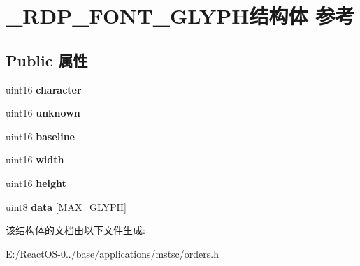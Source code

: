 \hypertarget{struct___r_d_p___f_o_n_t___g_l_y_p_h}{}\section{\+\_\+\+R\+D\+P\+\_\+\+F\+O\+N\+T\+\_\+\+G\+L\+Y\+P\+H结构体 参考}
\label{struct___r_d_p___f_o_n_t___g_l_y_p_h}
\subsection*{Public 属性}
\begin{DoxyCompactItemize}
\item 
\mbox{\label{struct___r_d_p___f_o_n_t___g_l_y_p_h_ae4639910e2f6b82de87cd71791132232}} 
uint16 {\bfseries character}
\item 
\mbox{\label{struct___r_d_p___f_o_n_t___g_l_y_p_h_a5715a1e66a080bb0d429796d40be05cf}} 
uint16 {\bfseries unknown}
\item 
\mbox{\label{struct___r_d_p___f_o_n_t___g_l_y_p_h_a91fbf7d173b2189c58fc49729c3cee1b}} 
uint16 {\bfseries baseline}
\item 
\mbox{\label{struct___r_d_p___f_o_n_t___g_l_y_p_h_a0409fa89acf53b53bfaee92eb9338c5c}} 
uint16 {\bfseries width}
\item 
\mbox{\label{struct___r_d_p___f_o_n_t___g_l_y_p_h_a1af27fcff7b4b81e06b05016b24d035b}} 
uint16 {\bfseries height}
\item 
\mbox{\label{struct___r_d_p___f_o_n_t___g_l_y_p_h_a78494392ab5571f846a4d051f5cb99c7}} 
uint8 {\bfseries data} \mbox{[}M\+A\+X\+\_\+\+G\+L\+Y\+PH\mbox{]}
\end{DoxyCompactItemize}


该结构体的文档由以下文件生成\+:\begin{DoxyCompactItemize}
\item 
E\+:/\+React\+O\+S-\/0../base/applications/mstsc/orders.\+h\end{DoxyCompactItemize}
